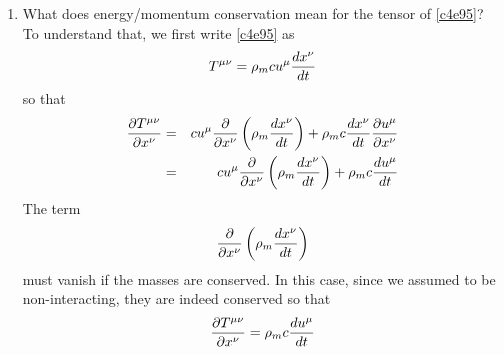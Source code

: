\begin{enumerate}
\item What does energy/momentum conservation mean for the tensor of \eqref{c4e95}?
To understand that, we first write \eqref{c4e95} as
\begin{equation}\label{c4e96}
T^{\mu\nu} = \rho_m c u^\mu\frac{d{x^\nu}}{d{t}}
\end{equation}
so that
\begin{eqnarray*}
\frac{\partial{T^{\mu\nu}}}{\partial{x^\nu}} &=& cu^\mu\frac{\partial}{\partial x^\nu}\left(\rho_m\frac{d{x^\nu}}{d{t}}\right)
+ \rho_m c\frac{d{x^\nu}}{d{t}}\frac{\partial{u^\mu}}{\partial{x^\nu}} \\
 &=& cu^\mu\frac{\partial}{\partial x^\nu}\left(\rho_m\frac{d{x^\nu}}{d{t}}\right) + \rho_m c\frac{d{u^\mu}}{d{t}}
\end{eqnarray*}
The term
\[
\frac{\partial}{\partial x^\nu}\left(\rho_m\frac{d{x^\nu}}{d{t}}\right)
\]
must vanish if the masses are conserved. In this case, since we assumed to be
non-interacting, they are indeed conserved so that
\begin{equation}\label{c4e97}
\frac{\partial{T^{\mu\nu}}}{\partial{x^\nu}} = \rho_m c\frac{d{u^\mu}}{d{t}}
\end{equation}


\end{enumerate}
